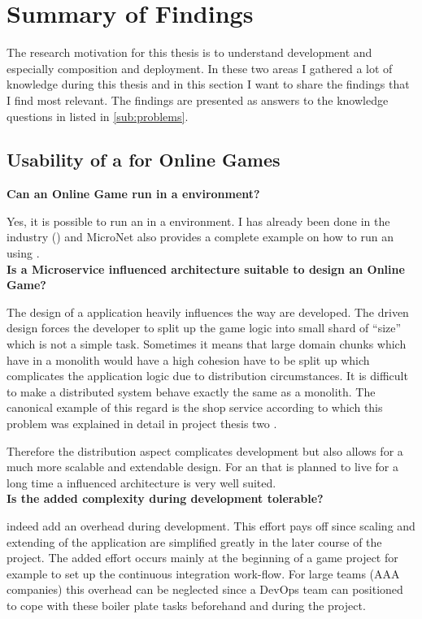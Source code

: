 \section{Summary of Findings}

The research motivation for this thesis is to understand \ms{} development and
especially \ms{} composition and deployment. In these two areas I gathered a lot
of knowledge during this thesis and in this section I want to share the findings
that I find most relevant. The findings are presented as answers to the
knowledge questions in listed in \autoref{sub:problems}.

\subsection{Usability of a \mss{} for Online Games}
\label{sub:usability_ms_og}

\noindent
\textbf{Can an Online Game run in a \ms{} environment?}

Yes, it is possible to run an \og{} in a \ms{} environment. I has already been
done in the industry (\cite{pronschinske2015turbine}) and MicroNet also
provides a complete example on how to run an \og{} using \mss{}.\\

\noindent
\textbf{Is a Microservice influenced architecture suitable to design an Online
Game?}

The design of a \og{} \mss{} application heavily influences the way \ogs{} are
developed. The \ms{} driven design forces the developer to split up the game
logic into small shard of \ms{} ``size'' which is not a simple task.
Sometimes it means that large domain chunks which have in a monolith would have
a high cohesion have to be split up which complicates the application logic due
to distribution circumstances. It is difficult to make a distributed system
behave exactly the same as a monolith. The canonical example of this regard is
the shop service according to which this problem was explained in detail in
project thesis two .

Therefore the distribution aspect complicates development but also allows for
a much more scalable and extendable design. For an \og{} that is
planned to live for a long time a \ms{} influenced architecture is very well
suited.\\

\noindent
\textbf{Is the added complexity during development tolerable?}

\mss{} indeed  add an overhead during development. This effort pays off
since scaling and extending of the application are simplified greatly in the
later course of the project. The added effort occurs mainly at the beginning of
a game project for example to set up the continuous integration work-flow. For
large teams (AAA companies) this overhead can be neglected since a DevOps team
can positioned to cope with these boiler plate tasks beforehand and during the
project.


